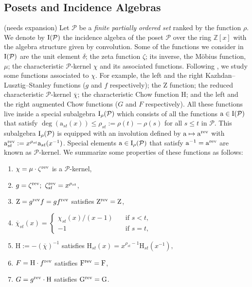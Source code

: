 \documentclass[12pt,letterpaper,english]{amsart}
\theoremstyle{teoremas}
\theoremstyle{definition}
\renewcommand{\H}{\mathrm{H}}
\newcommand{\calP}{\mathcal{P}}
\newcommand{\rev}{\normalfont\text{rev}}
\newcommand{\ZZ}{\mathbb{Z}}
\newcommand{\inc}{\normalfont\text{I}}
\newcommand{\barchi}{\overline{\chi}}
\begin{document}
\subsection{Posets and Incidence Algebras} (needs expansion)
Let \(\calP\) be a \emph{finite partially ordered set} ranked by the function \(\rho\).
We denote by \(\inc(\calP)\) the incidence algebra of the poset \(\calP\) over the ring
\(\ZZ[x]\) with the algebra structure given by convolution.
Some of the functions we consider in \(\inc(\calP)\) are the unit element \(\delta\);
the zeta function \(\zeta\); its
inverse, the M\"obius function, \(\mu\);
the characteristic \(\calP\)-kernel \(\chi\) and its associated functions.
Following \cite{ferroni-matherne-vecchi}, we study some functions associated to
\(\chi\). For example, the left and the right Kazhdan--Lusztig--Stanley functions
(\(g\) and \(f\) respectively); the \(\mathrm{Z}\) function;
the reduced characteristic \(\calP\)-kernel  \(\overline{\chi}\);
the characteristic Chow function \(\H\); and the left and the right
augmented Chow functions (\(G\) and \(F\) respectively). All these
functions live inside a special subalgebra \(\inc_{\rho}(\calP)\)
which consists of all the functions \(\mathrm{a}\in\inc(\calP)\)
that satisfy \(\deg(\mathrm{a}_{st}(x))\leq\rho_{st}:=\rho(t)-\rho(s)\)
for all \(s\leq t\) in \(\calP\).
This subalgebra \(\inc_\rho(\calP)\) is equipped with an involution
defined by \(\mathrm{a}\mapsto\mathrm{a}^{\rev}\) with
\(\mathrm{a}^{\rev}_{st}:= x^{\rho_{st}}\mathrm{a}_{st}(x^{-1})\).
Special elements \(\mathrm{a}\in\inc_\rho(\calP)\) that satisfy
\(\mathrm{a}^{-1} = \mathrm{a}^{\rev}\) are known as \(\calP\)-kernel.
We summarize some properties of these functions as follows:
\begin{enumerate}
    \item \(\chi = \mu\cdot\zeta^{\rev}\) is a \(\calP\)-kernel,
    \item \(g = \zeta^{\rev};\ \zeta^{\rev}_{st} = x^{\rho_{st}}\),
    \item \(\mathrm{Z} = g^{\rev}f = gf^{\rev}\) satisfies \(\mathrm{Z}^{\rev}
          = \mathrm{Z}\),
    \item \(\displaystyle\barchi_{st}(x) =
          \begin{cases}
              \chi_{st}(x)/(x-1)\quad & \text{if } s<t,   \\
              -1 \quad                & \text{if } s = t,
          \end{cases}\)
    \item \(\H:=-\left(\barchi\right)^{-1}\) satisfies \(\H_{st}(x) = x^{\rho_{st}-1}\H_{st}(x^{-1}),\)
    \item \(F = \H\cdot f^{\rev}\) satisfies \(\mathrm{F}^{\rev}= \mathrm{F}\),
    \item \(G = g^{\rev}\cdot \H\) satisfies \(\mathrm{G}^{\rev}= \mathrm{G}\).
\end{enumerate}
\end{document}
